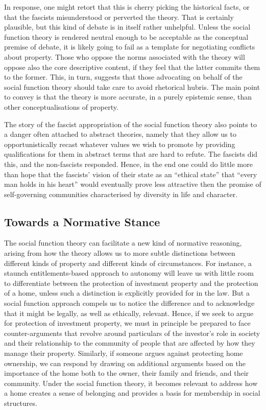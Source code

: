 In response, one might retort that this is cherry picking the historical facts, or that the fascists misunderstood or perverted the theory. That is certainly plausible, but this kind of debate is in itself rather unhelpful. Unless the social function theory is rendered neutral enough to be acceptable as the conceptual premise of debate, it is likely going to fail as a template for negotiating conflicts about property. Those who oppose the norms associated with the theory will oppose also the core descriptive content, if they feel that the latter commits them to the former. This, in turn, suggests that those advocating on behalf of the social function theory should take care to avoid rhetorical hubris. The main point to convey is that the theory is more accurate, in a purely epistemic sense, than other conceptualisations of property.

The story of the fascist appropriation of the social function theory also points to a danger often attached to abstract theories, namely that they allow us to opportunistically recast whatever values we wish to promote by providing qualifications for them in abstract terms that are hard to refute. The fascists did this, and the non-fascists responded. Hence, in the end one could do little more than hope that the fascists' vision of their state as an ``ethical state'' that ``every man holds in his heart'' would eventually prove less attractive then the promise of self-governing communities characterised by diversity in life and character.

\subsection{Towards a Normative Stance}

The social function theory can facilitate a new kind of normative reasoning, arising from how the theory allows us to  more subtle distinctions between different kinds of property and different kinds of circumstances. For instance, a staunch entitlements-based approach to autonomy will leave us with little room to differentiate between the protection of investment property and the protection of a home, unless such a distinction is explicitly provided for in the law. But a social function approach compels us to notice the difference and to acknowledge that it might be legally, as well as ethically, relevant. Hence, if we seek to argue for protection of investment property, we must in principle be prepared to face counter-arguments that revolve around particulars of the investor's role in society and their relationship to the community of people that are affected by how they manage their property. Similarly, if someone argues against protecting home ownership, we can respond by drawing on additional arguments based on the importance of the home both to the owner, their family and friends, and their community. Under the social function theory, it becomes relevant to address how a home creates a sense of belonging and provides a basis for membership in social structures.

